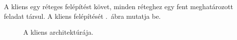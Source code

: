 \documentclass[11pt, a4paper]{article}
\begin{document}
	A kliens egy réteges felépítést követ, minden réteghez egy fent meghatározott feladat társul. A kliens felépítését .~ábra mutatja be.
	       \begin{figure}[h!]
	       	\center
	       	\caption{A kliens architektúrája.}
	       	\label{fig:client-arch}
	       \end{figure}
	
\end{document}
